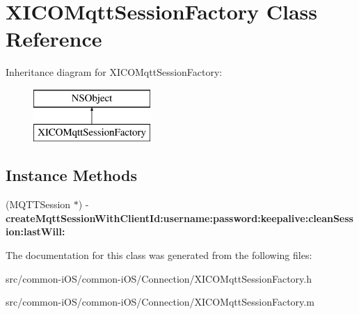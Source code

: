 \hypertarget{interface_x_i_c_o_mqtt_session_factory}{}\section{X\+I\+C\+O\+Mqtt\+Session\+Factory Class Reference}
\label{interface_x_i_c_o_mqtt_session_factory}
Inheritance diagram for X\+I\+C\+O\+Mqtt\+Session\+Factory\+:\begin{figure}[H]
\begin{center}
\leavevmode
\includegraphics[height=2.000000cm]{interface_x_i_c_o_mqtt_session_factory}
\end{center}
\end{figure}
\subsection*{Instance Methods}
\begin{DoxyCompactItemize}
\item 
\hypertarget{interface_x_i_c_o_mqtt_session_factory_a9b7d781e6d9fd8452129a4df9b901347}{}\label{interface_x_i_c_o_mqtt_session_factory_a9b7d781e6d9fd8452129a4df9b901347} 
(M\+Q\+T\+T\+Session $\ast$) -\/ {\bfseries create\+Mqtt\+Session\+With\+Client\+Id\+:username\+:password\+:keepalive\+:clean\+Session\+:last\+Will\+:}
\end{DoxyCompactItemize}


The documentation for this class was generated from the following files\+:\begin{DoxyCompactItemize}
\item 
src/common-\/i\+O\+S/common-\/i\+O\+S/\+Connection/X\+I\+C\+O\+Mqtt\+Session\+Factory.\+h\item 
src/common-\/i\+O\+S/common-\/i\+O\+S/\+Connection/X\+I\+C\+O\+Mqtt\+Session\+Factory.\+m\end{DoxyCompactItemize}

